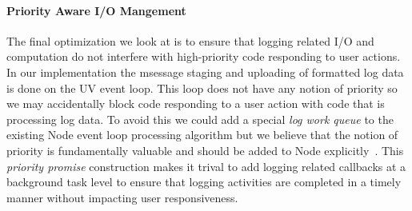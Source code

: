 \paragraph{Priority Aware I/O Mangement}
\noindent
The final optimization we look at is to ensure 
that logging related I/O and computation do not interfere with high-priority 
code responding to user actions. In our implementation the msessage staging 
and uploading of formatted log data is done on the UV event loop. This loop does 
not have any notion of priority so we may accidentally block code responding 
to a user action with code that is processing log data. To avoid this we could 
add a special \emph{log work queue} to the existing Node event loop processing 
algorithm but we believe that the notion of priority is 
fundamentally valuable and should be added to Node explicitly~\cite{asynchjs}. 
This \emph{priority promise} construction makes it trival to add logging related 
callbacks at a background task level to ensure 
that logging activities are completed in a timely manner without impacting user 
responsiveness.






